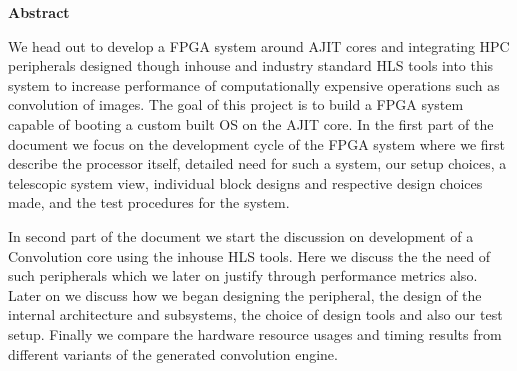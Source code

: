 
\thispagestyle{empty}

\begin{center}
{\Large \textbf{Abstract}}\\%
\end{center}

\setlength{\parindent}{0em}
We head out to develop a FPGA system around AJIT cores and integrating HPC peripherals designed though inhouse and industry standard HLS
tools into this system to increase performance of computationally expensive operations such as convolution of images. The goal of this
project is to build a FPGA system capable of booting a custom built OS on the AJIT core. In the first part of the document we focus on the
development cycle of the FPGA system where we first describe the processor itself, detailed need for such a system, our setup choices, a
telescopic system view, individual block designs and respective design choices made, and the test procedures for the system.

In second part of the document we start the discussion on development of a Convolution core using the inhouse HLS tools. Here we discuss the
the need of such peripherals which we later on justify through performance metrics also. Later on we discuss how we began designing the
peripheral, the design of the internal architecture and subsystems, the choice of design tools and also our test setup. Finally we compare
the hardware resource usages and timing results from different variants of the generated convolution engine.

\afterpage{\blankpage}
\clearpage

